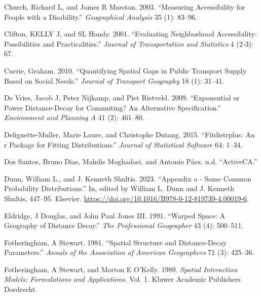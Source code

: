 \documentclass[preprint, 3p,
authoryear]{elsarticle} %
\newlength{\cslhangindent}
\newlength{\cslentryspacingunit} %
\newenvironment{CSLReferences}[2] %
 {%
  \setlength{\parindent}{0pt}
  \ifodd #1
  \let\oldpar\par
  \def\par{\hangindent=\cslhangindent\oldpar}
  \fi
  \setlength{\parskip}{#2\cslentryspacingunit}
 }%
 {}
\begin{document}
\begin{CSLReferences}{1}{0}
\leavevmode{}%
Church, Richard L, and James R Marston. 2003. {``Measuring Accessibility
for People with a Disability.''} \emph{Geographical Analysis} 35 (1):
83--96.

\leavevmode{}%
Clifton, KELLY J, and SL Handy. 2001. {``Evaluating Neighborhood
Accessibility: Possibilities and Practicalities.''} \emph{Journal of
Transportation and Statistics} 4 (2-3): 67.

\leavevmode{}%
Currie, Graham. 2010. {``Quantifying Spatial Gaps in Public Transport
Supply Based on Social Needs.''} \emph{Journal of Transport Geography}
18 (1): 31--41.

\leavevmode{}%
De Vries, Jacob J, Peter Nijkamp, and Piet Rietveld. 2009.
{``Exponential or Power Distance-Decay for Commuting? An Alternative
Specification.''} \emph{Environment and Planning A} 41 (2): 461--80.

\leavevmode{}%
Delignette-Muller, Marie Laure, and Christophe Dutang. 2015.
{``Fitdistrplus: An r Package for Fitting Distributions.''}
\emph{Journal of Statistical Software} 64: 1--34.

\leavevmode{}%
Dos Santos, Bruno Dias, Mahdis Moghadasi, and Antonio Páez. n.d.
{``ActiveCA.''}

\leavevmode{}%
Dunn, William L., and J. Kenneth Shultis. 2023. {``Appendix a - Some
Common Probability Distributions.''} In, edited by William L. Dunn and
J. Kenneth Shultis, 447--95. Elsevier.
\url{https://doi.org/10.1016/B978-0-12-819739-4.00019-6}.

\leavevmode{}%
Eldridge, J Douglas, and John Paul Jones III. 1991. {``Warped Space: A
Geography of Distance Decay.''} \emph{The Professional Geographer} 43
(4): 500--511.

\leavevmode{}%
Fotheringham, A Stewart. 1981. {``Spatial Structure and Distance-Decay
Parameters.''} \emph{Annals of the Association of American Geographers}
71 (3): 425--36.

\leavevmode{}%
Fotheringham, A Stewart, and Morton E O'Kelly. 1989. \emph{Spatial
Interaction Models: Formulations and Applications}. Vol. 1. Kluwer
Academic Publishers Dordrecht.


\end{CSLReferences}
\end{document}
